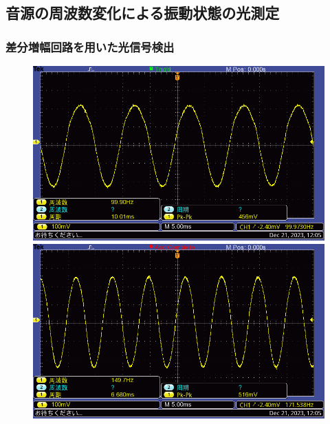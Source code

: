 \documentclass{ltjsarticle}
\begin{document}
	\subsection{音源の周波数変化による振動状態の光測定}
		\subsubsection{差分増幅回路を用いた光信号検出}
			\begin{figure}[H]
			\centering
			\begin{minipage}{0.4\columnwidth}
			\centering
			\includegraphics[width = \columnwidth]{figs/F0006TEK.PNG}
			\end{minipage}
			\hspace{0.04\columnwidth}
			\begin{minipage}{0.4\columnwidth}
			\centering
			\includegraphics[width = \columnwidth]{figs/F0007TEK.PNG}
			\end{minipage}
			\hspace{0.04\columnwidth}

\end{figure}
\end{document}
